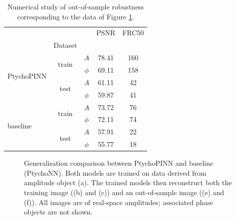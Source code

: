 \documentclass[sn-mathphys]{sn-jnl}%
\theoremstyle{thmstyleone}%
\theoremstyle{thmstyletwo}%
\theoremstyle{thmstylethree}%
\begin{document}
\begin{table}[h]
\begin{center}
\caption{Numerical study of out-of-sample robustness corresponding to the data of Figure \ref{fig:gen_detailed}.}\label{tab2}%
\begin{tabular}{lcccc}
\toprule
           &      &      &  PSNR &  FRC50 \\
& Dataset & &       &        \\
\midrule
\multirow{4}{*}{PtychoPINN} & \multirow{2}{*}{train} & $A$ & 78.41 & 160 \\
           &      & $\phi$ & 69.11 & 158 \\
\cline{2-5}
           & \multirow{2}{*}{test} & $A$ & 61.11 &  42 \\
           &      & $\phi$ & 59.87 &  41 \\
\cline{1-5}
\cline{2-5}
\multirow{4}{*}{baseline} & \multirow{2}{*}{train} & $A$ & 73.72 &  76 \\
           &      & $\phi$ & 72.11 &  74 \\
\cline{2-5}
           & \multirow{2}{*}{test} & $A$ & 57.91 &  22 \\
           &      & $\phi$ & 55.77 &  18 \\
\bottomrule
\end{tabular}
\end{center}
\end{table}


\begin{figure}%
    \centering
\vfill
    \caption{Generalisation comparison between PtychoPINN and baseline (PtychoNN). Both models are trained on data derived from amplitude object (a). The trained models then reconstruct both the training image ((b) and (c)) and an out-of-sample image ((e) and (f)). All images are of real-space amplitudes; associated phase objects are not shown.  }%
    \label{fig:gen_detailed}%
\end{figure}
\end{document}
